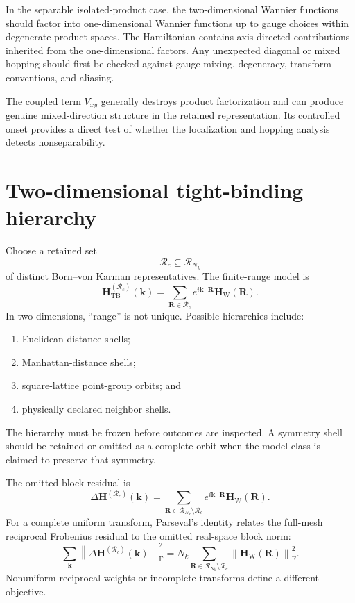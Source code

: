 In the separable isolated-product case, the two-dimensional Wannier functions
should factor into one-dimensional Wannier functions up to gauge choices within
degenerate product spaces. The Hamiltonian contains axis-directed contributions
inherited from the one-dimensional factors. Any unexpected diagonal or mixed
hopping should first be checked against gauge mixing, degeneracy, transform
conventions, and aliasing.

The coupled term $V_{xy}$ generally destroys product factorization and can
produce genuine mixed-direction structure in the retained representation. Its
controlled onset provides a direct test of whether the localization and
hopping analysis detects nonseparability.

\section*{Two-dimensional tight-binding hierarchy}

Choose a retained set
\begin{equation}
    \mathcal R_c\subseteq\mathcal R_{N_k}
\end{equation}
of distinct Born--von Karman representatives. The finite-range model is
\begin{equation}
    \mathbf H_{\mathrm{TB}}^{(\mathcal R_c)}(\mathbf k)
    =
    \sum_{\mathbf R\in\mathcal R_c}
    e^{i\mathbf k\cdot\mathbf R}
    \mathbf H_{\mathrm W}(\mathbf R).
\end{equation}
In two dimensions, ``range'' is not unique. Possible hierarchies include:
\begin{enumerate}
    \item Euclidean-distance shells;
    \item Manhattan-distance shells;
    \item square-lattice point-group orbits; and
    \item physically declared neighbor shells.
\end{enumerate}
The hierarchy must be frozen before outcomes are inspected. A symmetry shell
should be retained or omitted as a complete orbit when the model class is
claimed to preserve that symmetry.

The omitted-block residual is
\begin{equation}
    \Delta\mathbf H^{(\mathcal R_c)}(\mathbf k)
    =
    \sum_{\mathbf R\in\mathcal R_{N_k}\setminus\mathcal R_c}
    e^{i\mathbf k\cdot\mathbf R}
    \mathbf H_{\mathrm W}(\mathbf R).
\end{equation}
For a complete uniform transform, Parseval's identity relates the full-mesh
reciprocal Frobenius residual to the omitted real-space block norm:
\begin{equation}
    \sum_{\mathbf k}
    \left\lVert
        \Delta\mathbf H^{(\mathcal R_c)}(\mathbf k)
    \right\rVert_{\mathrm F}^2
    =
    N_k
    \sum_{\mathbf R\in\mathcal R_{N_k}\setminus\mathcal R_c}
    \left\lVert
        \mathbf H_{\mathrm W}(\mathbf R)
    \right\rVert_{\mathrm F}^2.
\end{equation}
Nonuniform reciprocal weights or incomplete transforms define a different
objective.

